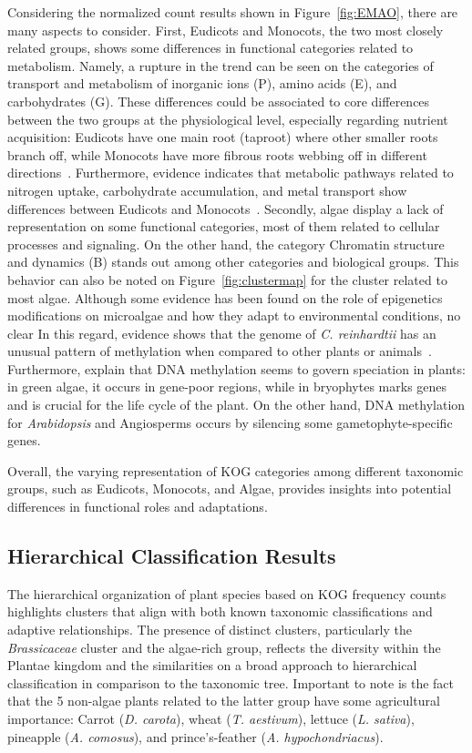 Considering the normalized count results shown in 
Figure~\ref{fig:EMAO}, there are many aspects to consider.
First, Eudicots and Monocots, the two most closely 
related groups, shows some differences in functional 
categories related to metabolism. Namely, a rupture 
in the trend can be seen on 
the categories of transport and metabolism of inorganic ions 
(P), amino acids (E), and carbohydrates (G). These 
differences could be associated to core differences between 
the two groups at the physiological level, especially 
regarding nutrient acquisition: Eudicots have one main root 
(taproot) where other smaller roots branch off, while 
Monocots have more fibrous roots webbing off in different 
directions~\citep{freschet2021}. Furthermore, evidence 
indicates that metabolic pathways related to nitrogen 
uptake, carbohydrate accumulation, and metal 
transport show differences between Eudicots and 
Monocots~\citep{yang2020,tian2016}.
Secondly, algae display a lack of representation on some 
functional categories, most of them related to cellular 
processes and signaling. On the other hand, the category 
Chromatin structure and dynamics (B) stands out among other 
categories and biological groups. This behavior can also 
be noted on Figure~\ref{fig:clustermap} for the cluster
related to most algae. Although some evidence has been found on 
the role of epigenetics modifications on microalgae and how 
they adapt to environmental conditions, no clear 
In this regard, evidence shows that the genome of \emph{C. 
reinhardtii} has an unusual pattern of methylation when compared 
to other plants or animals~\citep{bacova2020}. Furthermore, 
\cite{vigneau2021} explain that DNA methylation seems to govern 
speciation in plants: in green algae, it occurs in gene-poor 
regions, while in bryophytes marks genes and is crucial for the 
life cycle of the plant. On the other hand, DNA methylation for 
\emph{Arabidopsis} and Angiosperms occurs by silencing some 
gametophyte-specific genes.

Overall, the varying 
representation of KOG categories among different taxonomic 
groups, such as Eudicots, Monocots, and Algae, provides 
insights into potential differences in functional roles 
and adaptations.


\subsection{Hierarchical Classification Results}
\label{sec:conclusion.hierarchy}

The hierarchical organization of plant species based on 
KOG frequency counts highlights clusters that align with 
both known taxonomic classifications and adaptive 
relationships. The presence of distinct clusters, 
particularly the \emph{Brassicaceae} cluster and the 
algae-rich group, reflects the diversity within the 
Plantae kingdom and the similarities on a broad approach to
hierarchical classification in comparison to the taxonomic tree.
Important to note is the fact that the 5 non-algae plants related 
to the latter group have some agricultural importance: Carrot 
(\emph{D. carota}), wheat (\emph{T. aestivum}), lettuce 
(\emph{L. sativa}), pineapple (\emph{A. comosus}), and 
prince's-feather (\emph{A. hypochondriacus}).

